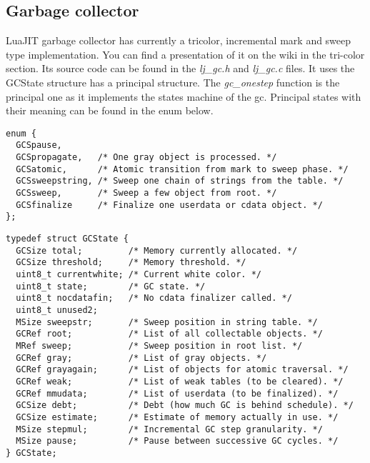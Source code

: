 
\subsection{Garbage collector}
\label{Subsec:gc}

LuaJIT garbage collector has currently a tricolor, incremental mark and sweep
type implementation. You can find a presentation of it on the wiki
\cite{luajit-gc} in the tri-color section. Its source code can be found in the
\emph{lj\_gc.h} and \emph{lj\_gc.c} files. It uses the GCState structure has a
principal structure. The \emph{gc\_onestep} function is the principal one as it
implements the states machine of the gc. Principal states with their meaning can be
found in the enum below.

\begin{lstlisting}[style=CStyle]
enum {
  GCSpause,
  GCSpropagate,   /* One gray object is processed. */
  GCSatomic,      /* Atomic transition from mark to sweep phase. */
  GCSsweepstring, /* Sweep one chain of strings from the table. */
  GCSsweep,       /* Sweep a few object from root. */
  GCSfinalize     /* Finalize one userdata or cdata object. */
};
\end{lstlisting}

\begin{lstlisting}[style=CStyle]
typedef struct GCState {
  GCSize total;         /* Memory currently allocated. */
  GCSize threshold;     /* Memory threshold. */
  uint8_t currentwhite; /* Current white color. */
  uint8_t state;        /* GC state. */
  uint8_t nocdatafin;   /* No cdata finalizer called. */
  uint8_t unused2;
  MSize sweepstr;       /* Sweep position in string table. */
  GCRef root;           /* List of all collectable objects. */
  MRef sweep;           /* Sweep position in root list. */
  GCRef gray;           /* List of gray objects. */
  GCRef grayagain;      /* List of objects for atomic traversal. */
  GCRef weak;           /* List of weak tables (to be cleared). */
  GCRef mmudata;        /* List of userdata (to be finalized). */
  GCSize debt;          /* Debt (how much GC is behind schedule). */
  GCSize estimate;      /* Estimate of memory actually in use. */
  MSize stepmul;        /* Incremental GC step granularity. */
  MSize pause;          /* Pause between successive GC cycles. */
} GCState;
\end{lstlisting}

